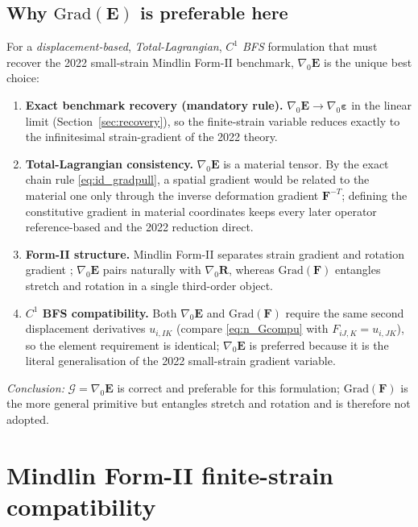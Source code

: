 \documentclass[11pt]{article}
\newcommand{\gradz}{\nabla_{0}}
\newcommand{\bF}{\mathbf{F}}
\newcommand{\bE}{\mathbf{E}}
\newcommand{\bep}{\boldsymbol{\varepsilon}}
\newcommand{\bR}{\mathbf{R}}
\newcommand{\gradz}{\nabla_{0}}
\newcommand{\bF}{\mathbf{F}}
\newcommand{\bE}{\mathbf{E}}
\newcommand{\bep}{\boldsymbol{\varepsilon}}
\newcommand{\bR}{\mathbf{R}}
\begin{document}
\subsection{Why $\mathrm{Grad}(\mathbf{E})$ is preferable here}

For a \emph{displacement-based}, \emph{Total-Lagrangian},
\emph{$C^{1}$ BFS} formulation that must recover the 2022 small-strain
Mindlin Form-II benchmark, $\gradz\bE$ is the unique best choice:

\begin{enumerate}
\item \textbf{Exact benchmark recovery (mandatory rule).} $\gradz\bE\to
\gradz\bep$ in the linear limit (Section~\ref{sec:recovery}), so the
finite-strain variable reduces exactly to the infinitesimal
strain-gradient of the 2022 theory.

\item \textbf{Total-Lagrangian consistency.} $\gradz\bE$ is a material
tensor. By the exact chain rule \eqref{eq:id_gradpull}, a spatial
gradient would be related to the material one only through the inverse
deformation gradient $\bF^{-T}$; defining the constitutive gradient in
material coordinates keeps every later operator reference-based and the
2022 reduction direct.

\item \textbf{Form-II structure.} Mindlin Form-II separates strain
gradient and rotation gradient \cite{MindlinEshel1968,Aouadi2020};
$\gradz\bE$ pairs naturally with $\gradz\bR$, whereas
$\mathrm{Grad}(\mathbf{F})$ entangles stretch and rotation in a single
third-order object.

\item \textbf{$C^{1}$ BFS compatibility.} Both $\gradz\bE$ and
$\mathrm{Grad}(\mathbf{F})$ require the same second displacement
derivatives $u_{i,IK}$ (compare \eqref{eq:n_Gcompu} with
$F_{iJ,K}=u_{i,JK}$), so the element requirement is identical;
$\gradz\bE$ is preferred because it is the literal generalisation of
the 2022 small-strain gradient variable.
\end{enumerate}

\emph{Conclusion:} $\bm{\mathcal{G}}=\gradz\mathbf{E}$ is correct and
preferable for this formulation; $\mathrm{Grad}(\mathbf{F})$ is the
more general primitive but entangles stretch and rotation and is
therefore not adopted.

\section{Mindlin Form-II finite-strain compatibility}
\label{sec:compat}
\end{document}
